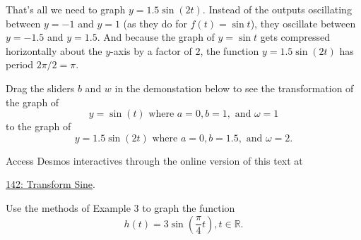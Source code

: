 \documentclass{ximera}
\begin{document}
\begin{example}
That's all we need to graph $y=1.5 \sin (2t)$. Instead of the outputs oscillating between $y=-1$ and $y=1$ (as they do for $f(t)=\sin t$), they oscillate between $y=-1.5$ and $y=1.5$. And because the graph of $y=\sin t$ gets compressed horizontally about the $y$-axis by a factor of $2$, the function $y=1.5 \sin (2t)$ has period $2\pi / 2 = \pi$.

 Drag the sliders $b$ and $w$ in the demonstation below to see the transformation of the graph of
\[
  y = \sin (t) \text{ where } a=0, b=1, \text{ and }\omega = 1
\] 
to the graph of 
\[
  y = 1.5 \sin (2t) \text{ where } a=0, b=1.5, \text{ and }\omega = 2 .
\] 

Access Desmos interactives through the online version of this text at
 
\href{https://www.desmos.com/calculator/qrkgbi3gtr}{142: Transform Sine}.

 
\begin{onlineOnly}
    \begin{center}
\end{center}
\end{onlineOnly}
\end{example}

\begin{question}\label{Qdgt4jh65}
Use the methods of Example 3 to graph the function
\[
   h(t) = 3\sin\left( \frac{\pi}{4}t \right) , t\in \mathbb{R}.
\]
\end{question}
\end{document}
